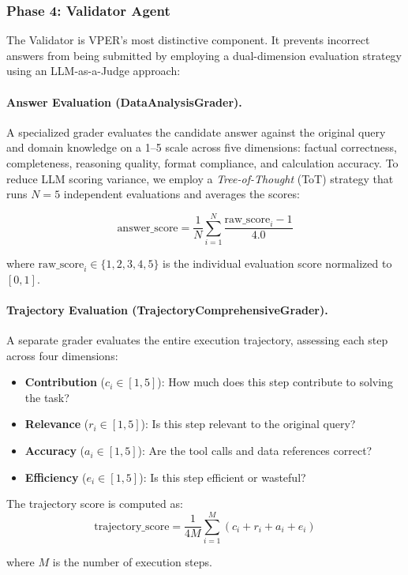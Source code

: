 \documentclass{article}
\begin{document}
\subsubsection{Phase 4: Validator Agent}

The Validator is VPER's most distinctive component.
It prevents incorrect answers from being submitted by employing a dual-dimension evaluation strategy using an LLM-as-a-Judge approach:

\paragraph{Answer Evaluation (DataAnalysisGrader).}
A specialized grader evaluates the candidate answer against the original query and domain knowledge on a 1--5 scale across five dimensions: factual correctness, completeness, reasoning quality, format compliance, and calculation accuracy.
To reduce LLM scoring variance, we employ a \emph{Tree-of-Thought} (ToT) strategy that runs $N=5$ independent evaluations and averages the scores:

\[
\text{answer\_score} = \frac{1}{N} \sum_{i=1}^{N} \frac{\text{raw\_score}_i - 1}{4.0}
\]

where $\text{raw\_score}_i \in \{1, 2, 3, 4, 5\}$ is the individual evaluation score normalized to $[0, 1]$.

\paragraph{Trajectory Evaluation (TrajectoryComprehensiveGrader).}
A separate grader evaluates the entire execution trajectory, assessing each step across four dimensions:
\begin{itemize}[leftmargin=1.5em]
    \item \textbf{Contribution} ($c_i \in [1,5]$): How much does this step contribute to solving the task?
    \item \textbf{Relevance} ($r_i \in [1,5]$): Is this step relevant to the original query?
    \item \textbf{Accuracy} ($a_i \in [1,5]$): Are the tool calls and data references correct?
    \item \textbf{Efficiency} ($e_i \in [1,5]$): Is this step efficient or wasteful?
\end{itemize}

The trajectory score is computed as:
\[
\text{trajectory\_score} = \frac{1}{4M} \sum_{i=1}^{M} (c_i + r_i + a_i + e_i)
\]

where $M$ is the number of execution steps.
\end{document}
